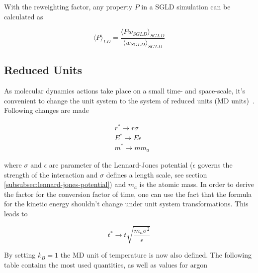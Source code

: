 \documentclass[a4paper]{article}
\begin{document}
With the reweighting factor, any property $P$ in a SGLD simulation can be calculated as

\begin{equation}
\langle P \rangle_{LD} = \frac{\langle P w_{SGLD} \rangle_{SGLD}}{\langle w_{SGLD} \rangle_{SGLD}}
\label{eq:quantity_reweighting}
\end{equation}

\subsection{Reduced Units}

As molecular dynamics actions take place on a small time- and space-scale, it's convenient to change the unit system to the system of reduced units (MD units)~\cite{Rapaport2004}. Following changes are made

\begin{align}
& r^*\rightarrow r \sigma \\
& E^* \rightarrow E \epsilon \\
& m^* \rightarrow m m_a
\end{align}

where $\sigma$ and $\epsilon$ are parameter of the Lennard-Jones potential ($\epsilon$ governs the strength of the interaction and $\sigma$ defines a length scale, see section \ref{subsubsec:lennard-jones-potential}) and $m_a$ is the atomic mass. In order to derive the factor for the conversion factor of time, one can use the fact that the formula for the kinetic energy shouldn't change under unit system transformations. This leads to

\begin{equation}
t^* \rightarrow t \sqrt{\frac{m_a \sigma^2}{\epsilon}}
\label{eq:scale_time}
\end{equation}

By setting $k_B = 1$ the MD unit of temperature is now also defined. The following table contains the most used quantities, as well as values for argon~\cite{Rapaport2004}

\vspace{12pt}
\end{document}
